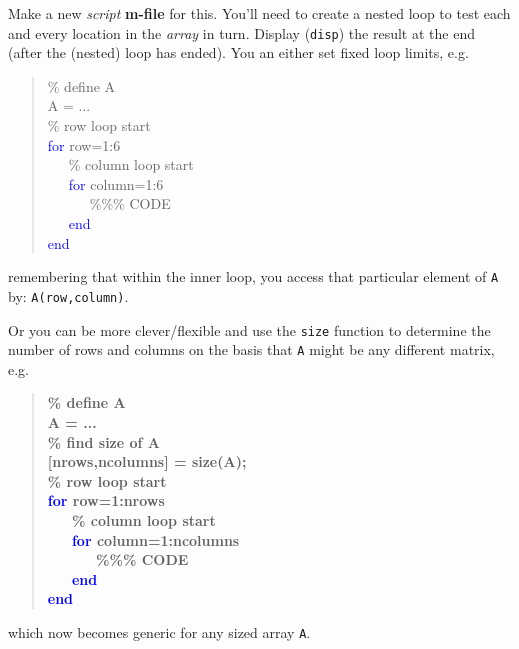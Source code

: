 \documentclass{tufte-book} %
\newenvironment{docspec}{\begin{quotation}\ttfamily\parskip0pt\parindent0pt\ignorespaces}{\end{quotation}}
\newenvironment{docspecbold}{\begin{quotation}\ttfamily\bfseries\parskip0pt\parindent0pt\ignorespaces}{\end{quotation}}
\begin{document}
Make  a new \textit{script} \textbf{m-file} for this. You'll need to create a nested loop to test each and every location in the \textit{array} in turn. Display (\texttt{disp}) the result at the end (after the (nested) loop has ended). You an either set fixed loop limits, e.g. 
\vspace{-0mm}
\begin{docspec}
\textcolor[rgb]{0,0.501961,0}{\% define A}\\
A = ...\\
\textcolor[rgb]{0,0.501961,0}{\% row loop start\\}
\textcolor{blue}{for} row=1:6\\
\ \ \ \textcolor[rgb]{0,0.501961,0}{\% column loop start\\}
\ \ \ \textcolor{blue}{for} column=1:6\\
\ \ \ \ \ \ \textcolor[rgb]{0,0.501961,0}{\%\%\% CODE}\\
\ \ \ \textcolor{blue}{end}\\
\textcolor{blue}{end}
\end{docspec}
\vspace{-0mm}
remembering that within the inner loop, you access that particular element of \texttt{A} by: \texttt{A(row,column)}. 

Or you can be more clever/flexible and use the \texttt{size} function to determine the number of rows and columns on the basis that \texttt{A} might be any different matrix, e.g.
\vspace{-1mm}
\begin{docspecbold}
\textcolor[rgb]{0,0.501961,0}{\% define A}\\
A = ...\\
\textcolor[rgb]{0,0.501961,0}{\% find size of A}\\
{[nrows,ncolumns]} = size(A);\\
\textcolor[rgb]{0,0.501961,0}{\% row loop start\\}
\textcolor{blue}{for} row=1:nrows\\
\ \ \ \textcolor[rgb]{0,0.501961,0}{\% column loop start\\}
\ \ \ \textcolor{blue}{for} column=1:ncolumns\\
\ \ \ \ \ \ \textcolor[rgb]{0,0.501961,0}{\%\%\% CODE}\\
\ \ \ \textcolor{blue}{end}\\
\textcolor{blue}{end}
\end{docspecbold}
\vspace{-1mm}
which now becomes generic for any sized array \texttt{A}.
\end{document}
